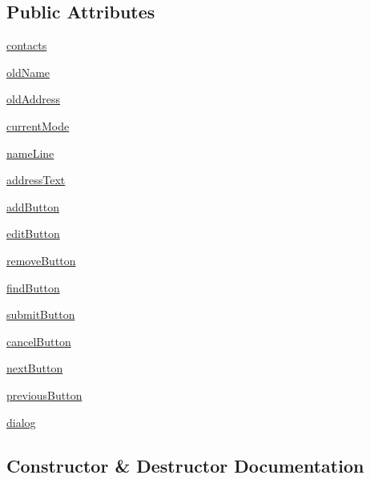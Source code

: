\subsection*{Public Attributes}
\begin{DoxyCompactItemize}
\item 
\hyperlink{classpart5_1_1AddressBook_acc599b8305959a0b79517d52f8d06af0}{contacts}
\item 
\hyperlink{classpart5_1_1AddressBook_af56798127356065e4af0b51425f0e33e}{old\+Name}
\item 
\hyperlink{classpart5_1_1AddressBook_a4d69fb2a36878e8063efe1db8ec7fbc5}{old\+Address}
\item 
\hyperlink{classpart5_1_1AddressBook_a02ba3359221f0106b9f29338d3ce3bce}{current\+Mode}
\item 
\hyperlink{classpart5_1_1AddressBook_a7e855a6b44da75b4c943d61ce9eda19a}{name\+Line}
\item 
\hyperlink{classpart5_1_1AddressBook_afad5b545ae3444fe5fdd0634f83cbf61}{address\+Text}
\item 
\hyperlink{classpart5_1_1AddressBook_ad50c5b8f888c87aaca915ceb8df1f64f}{add\+Button}
\item 
\hyperlink{classpart5_1_1AddressBook_a2c199dfaeda53749fef0862be92afa19}{edit\+Button}
\item 
\hyperlink{classpart5_1_1AddressBook_a0e3461b062bd23e1aac129b2de003a91}{remove\+Button}
\item 
\hyperlink{classpart5_1_1AddressBook_a2a9dd53ba6563413b9ea98c661b47370}{find\+Button}
\item 
\hyperlink{classpart5_1_1AddressBook_a1313615f7456f1113ce20ca668503166}{submit\+Button}
\item 
\hyperlink{classpart5_1_1AddressBook_a2b0585787c09ac330114df4f0d201b9b}{cancel\+Button}
\item 
\hyperlink{classpart5_1_1AddressBook_a412bfd89b6451b466f4bdb11d8d65400}{next\+Button}
\item 
\hyperlink{classpart5_1_1AddressBook_afd98d9acc031dd2885d7f79992ed968a}{previous\+Button}
\item 
\hyperlink{classpart5_1_1AddressBook_a86bbb5d38a872ed31c8ec607b674490c}{dialog}
\end{DoxyCompactItemize}


\subsection{Constructor \& Destructor Documentation}
\hypertarget{classpart5_1_1AddressBook_a6568a070e67b19e367044d22e313fd7c}{}
